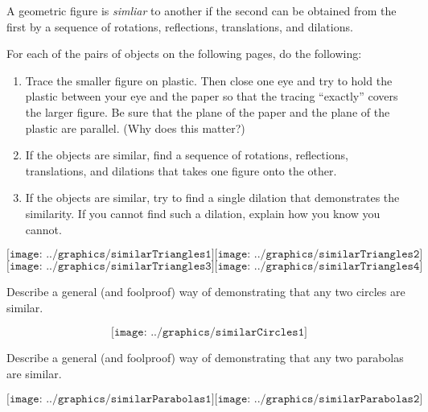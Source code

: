 \begin{definition}
A geometric figure is \emph{simliar} to another if the second can be obtained from the first by a sequence of rotations, reflections, translations, and dilations.  
\end{definition}

\begin{prob}
For each of the pairs of objects on the following pages, do the following:  
\begin{enumerate}
\item Trace the smaller figure on plastic.  Then close one eye and try to hold the plastic between your eye and the paper so that the tracing ``exactly'' covers the larger figure.   Be sure that the plane of the paper and the plane of the plastic are parallel.  (Why does this matter?) 
\item If the objects are similar, find a sequence of rotations, reflections, translations, and dilations that takes one figure onto the other.  
\item If the objects are similar, try to find a single dilation that demonstrates the similarity.   If you cannot find such a dilation, explain how you know you cannot.  
\end{enumerate}
\end{prob}
\vfill
{}  
\[
\texttt{[image: ../graphics/similarTriangles1]}
\texttt{[image: ../graphics/similarTriangles2]}
\]
\vfill
\newpage
\vfill
\[
\texttt{[image: ../graphics/similarTriangles3]}
\texttt{[image: ../graphics/similarTriangles4]}
\]
\vfill
\newpage
\begin{prob}
Describe a general (and foolproof) way of demonstrating that any two circles are similar. 
\end{prob}
\vfill
$$\texttt{[image: ../graphics/similarCircles1]}$$
\vfill
\newpage

\begin{prob}
Describe a general (and foolproof) way of demonstrating that any two parabolas are similar. 
\end{prob}
\vfill
\[
\texttt{[image: ../graphics/similarParabolas1]}
\texttt{[image: ../graphics/similarParabolas2]}
\]

\vfill



